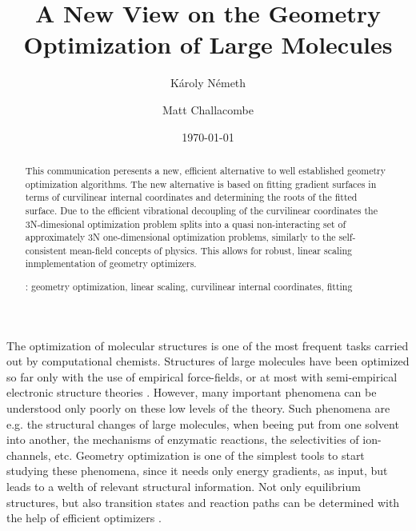 \documentclass[prl,aps,twocolumn,showpacs,twocolumngrid,superbib]{revtex4}
\begin{document}
\title{
A New View on the Geometry Optimization of Large Molecules            
}

\author{K\'aroly N\'emeth}
\author{Matt Challacombe}


\date{\today}

\begin{abstract}
{
This communication peresents a new, efficient alternative to well established
geometry optimization algorithms. The new alternative is based on
fitting gradient surfaces in terms of curvilinear 
internal coordinates and 
determining the roots of the fitted surface. Due to the efficient 
vibrational decoupling of the curvilinear coordinates the 3N-dimesional
optimization problem splits into a quasi non-interacting
set of approximately 3N one-dimensional optimization problems, 
similarly to the self-consistent mean-field concepts of physics.
This allows for robust, linear scaling inmplementation of geometry optimizers.
}

\smallskip
{}: 
geometry optimization, linear scaling, 
curvilinear internal coordinates, fitting
\end{abstract}
 

\maketitle


The optimization of molecular structures is one of the most frequent
tasks carried out by computational chemists. 
Structures of large molecules have been optimized so far
only with the use of empirical force-fields, or at most with 
semi-empirical electronic structure theories 
\cite{Stewart_crambin_opt,Schlegel_plasminogen_opt}. However, many important phenomena
can be understood only poorly on these low levels of the theory. 
Such phenomena are e.g. the structural changes of large molecules, 
when beeing put from one solvent into another, the mechanisms of 
enzymatic reactions, the selectivities of ion-channels, etc. 
Geometry optimization is one of the simplest tools to start studying 
these phenomena, since it needs only energy gradients, as input, but 
leads to a welth of relevant structural information.
Not only equilibrium structures, but also transition states and reaction
paths can be determined with the help of efficient optimizers 
\cite{nudged_elastic_band}.
\end{document}
